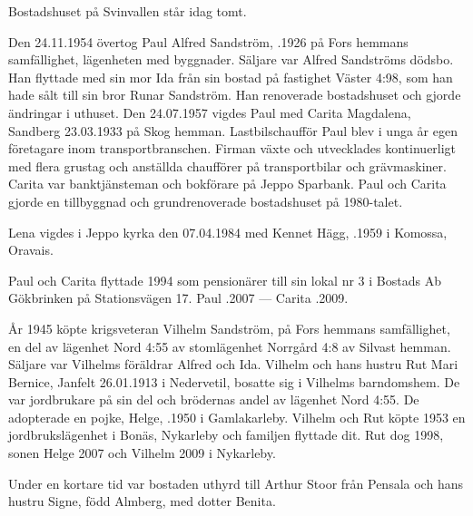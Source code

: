 Bostadshuset på Svinvallen står idag tomt.


%
Den 24.11.1954 övertog Paul Alfred Sandström, .1926 på Fors hemmans samfällighet, lägenheten med byggnader. Säljare var Alfred Sandströms dödsbo. Han flyttade med sin mor Ida från sin bostad på fastighet Väster 4:98, som han hade sålt till sin bror Runar Sandström. Han renoverade bostadshuset och gjorde ändringar i uthuset. Den 24.07.1957 vigdes Paul med Carita Magdalena, \textborn Sandberg 23.03.1933 på Skog hemman. Lastbilschaufför Paul blev i unga år egen företagare inom transportbranschen. Firman växte och utvecklades kontinuerligt med flera grustag och anställda chaufförer på transportbilar och grävmaskiner. Carita var banktjänsteman och bokförare på Jeppo Sparbank. Paul och Carita gjorde en tillbyggnad och grundrenoverade bostadshuset på 1980-talet.
\begin{jhchildren}
  \item {}
  \item {}
\end{jhchildren}
Lena vigdes i Jeppo kyrka den 07.04.1984 med Kennet Hägg, .1959 i Komossa, Oravais.

Paul och Carita flyttade 1994 som pensionärer till sin lokal nr 3 i Bostads Ab Gökbrinken på Stationsvägen 17.
Paul .2007  ---  Carita .2009.


%
År 1945 köpte krigsveteran Vilhelm Sandström,  på Fors hemmans samfällighet, en del av lägenhet Nord 4:55 av stomlägenhet Norrgård 4:8 av Silvast hemman. Säljare var Vilhelms föräldrar Alfred och Ida. Vilhelm och hans hustru Rut Mari Bernice, \textborn Janfelt 26.01.1913 i Nedervetil, bosatte sig i Vilhelms barndomshem. De var jordbrukare på sin del och brödernas andel av lägenhet Nord 4:55. De adopterade en pojke, Helge, .1950 i Gamlakarleby. Vilhelm och Rut köpte 1953 en jordbrukslägenhet i Bonäs, Nykarleby och familjen flyttade dit. Rut dog 1998, sonen Helge 2007 och Vilhelm 2009 i Nykarleby.

Under en kortare tid var bostaden uthyrd till Arthur Stoor från Pensala och hans hustru Signe, född Almberg, med dotter Benita.


